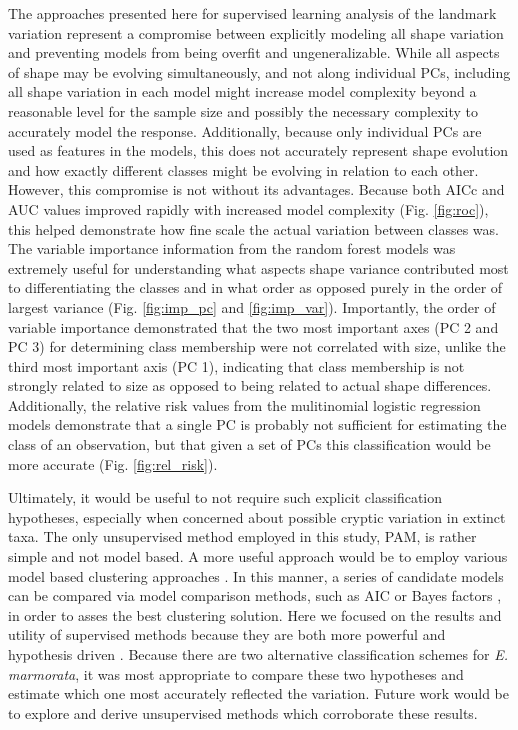 \documentclass[12pt,letterpaper]{article}\usepackage{graphicx, color}
\begin{document}
The approaches presented here for supervised learning analysis of the landmark variation represent a compromise between explicitly modeling all shape variation and preventing models from being overfit and ungeneralizable. While all aspects of shape may be evolving simultaneously, and not along individual PCs, including all shape variation in each model might increase model complexity beyond a reasonable level for the sample size and possibly the necessary complexity to accurately model the response. Additionally, because only individual PCs are used as features in the models, this does not accurately represent shape evolution and how exactly different classes might be evolving in relation to each other. However, this compromise is not without its advantages. Because both AICc and AUC values improved rapidly with increased model complexity (Fig. \ref{fig:roc}), this helped demonstrate how fine scale the actual variation between classes was. The variable importance information from the random forest models was extremely useful for understanding what aspects shape variance contributed most to differentiating the classes and in what order as opposed purely in the order of largest variance (Fig. \ref{fig:imp_pc} and \ref{fig:imp_var}). Importantly, the order of variable importance demonstrated that the two most important axes (PC 2 and PC 3) for determining class membership were not correlated with size, unlike the third most important axis (PC 1), indicating that class membership is not strongly related to size as opposed to being related to actual shape differences. Additionally, the relative risk values from the mulitinomial logistic regression models demonstrate that a single PC is probably not sufficient for estimating the class of an observation, but that given a set of PCs this classification would be more accurate (Fig. \ref{fig:rel_risk}).

Ultimately, it would be useful to not require such explicit classification hypotheses, especially when concerned about possible cryptic variation in extinct taxa. The only unsupervised method employed in this study, PAM, is rather simple and not model based. A more useful approach would be to employ various model based clustering approaches \citep{Fraley2002,Zhong2003,VanBocxlaer2013}. In this manner, a series of candidate models can be compared via model comparison methods, such as AIC or Bayes factors \citep{Fraley2002}, in order to asses the best clustering solution. %
Here we focused on the results and utility of supervised methods because they are both more powerful and hypothesis driven \citep{Hastie2009}. Because there are two alternative classification schemes for \textit{E. marmorata}, it was most appropriate to compare these two hypotheses and estimate which one most accurately reflected the variation. Future work would be to explore and derive unsupervised methods which corroborate these results.
\end{document}
